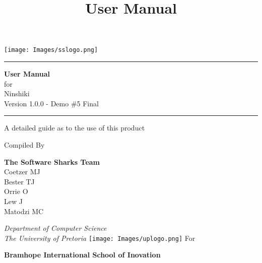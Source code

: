 \documentclass[a4paper, 12pt]{article}
\begin{document}
\title{User Manual}

\begin{titlepage}
\texttt{[image: Images/sslogo.png]}
	\centering
	
    \scshape
    \sffamily
	
	\vspace*{\baselineskip}
	
	\rule{\textwidth}{3pt}
	
	\vspace{0.75\baselineskip}
	
	\textrm{\LARGE \textbf{User Manual} \\ for\\ Ninshiki\\ 
    \small Version 1.0.0 - Demo \#5 Final\\}
	
	\vspace{0.75\baselineskip}
	
	\rule{\textwidth}{3pt} 
	
	\vspace{2\baselineskip}
	
	A detailed guide as to the use of this product 
	
	\vspace*{3\baselineskip}
	
	Compiled By
	
	\vspace{0.5\baselineskip}
	
    \textsf{\large
    \textrm{\textbf{The Software Sharks Team}} \\
    \small 
    Coetzer MJ \\
    Bester TJ \\
    Orrie O \\
    Lew J \\
    Matodzi MC \\
    } 
	
	\vspace{0.5\baselineskip}
	
	\textit{ Department of Computer Science \\ The University of Pretoria}
    \vfill
    \texttt{[image: Images/uplogo.png]}
    \vfill
    For
	\vspace{0.5\baselineskip}
	
    \textsf{\large
    \textrm{\textbf{Bramhope International School of Inovation}} \\
    } 

\end{titlepage}
\end{document}
